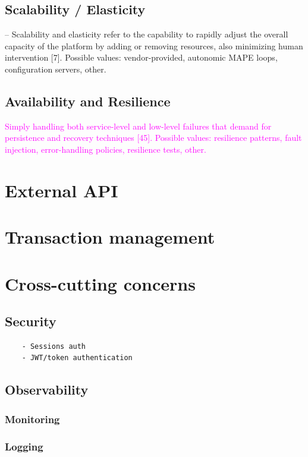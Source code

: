 \documentclass[thesis=M,english,hidelinks]{FITthesis}[2012/10/20]
\begin{document}
\subsection{Scalability / Elasticity}
\label{sec:scalability}
– Scalability and elasticity refer to the capability to rapidly adjust the overall capacity of the platform by adding or removing resources, also minimizing human intervention [7]. Possible values: vendor-provided, autonomic MAPE loops, configuration servers, other.
\subsection{Availability and Resilience}
\textcolor{magenta}{Simply handling both service-level and low-level failures that demand for persistence and recovery techniques [45]. Possible values: resilience patterns, fault injection, error-handling policies, resilience tests, other.}
% 
% 
\section{External API}
\label{sec:ext_api}


\section{Transaction management}


% 
%
\section{Cross-cutting concerns}
\subsection{Security}
\begin{verbatim}
    - Sessions auth
    - JWT/token authentication
\end{verbatim}


\subsection{Observability}
\subsubsection{Monitoring}
\subsubsection{Logging}
\end{document}
